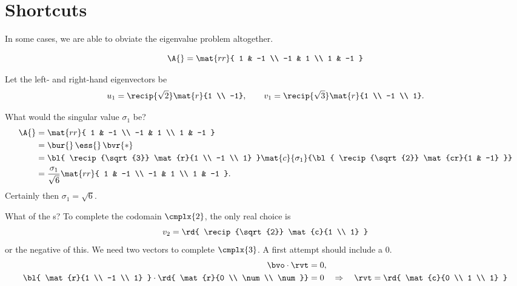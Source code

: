 \section{Shortcuts}
In some cases, we are able to obviate the eigenvalue problem altogether.

\begin{equation}
  \A{} = \mat{rr}{
   1 & -1 \\
  -1 &  1 \\
   1 & -1 }
\end{equation}

Let the left- and right-hand eigenvectors be
\begin{equation}
  u_{1} = \recip{\sqrt{2}} \mat{r}{1 \\ -1}, \qquad
  v_{1} = \recip{\sqrt{3}} \mat{r}{1 \\ -1 \\ 1}.
\end{equation}

What would the singular value $\sigma_{1}$ be?
%
\begin{equation}
  \begin{split}
  \A{} 
  &= \mat{rr}{
   1 & -1 \\
  -1 &  1 \\
   1 & -1 } \\
%
  &=
  \bur{}\, \ess{}\, \bvr{*} \\
%
  &=
  {\bl{ \recip{\sqrt{3}} \mat{r}{1 \\ -1 \\ 1} }} 
  \mat{c}{ \sigma_{1} }
  {\bl{ \recip{\sqrt{2}} \mat{cr}{1 & -1} }} \\
%
  &=
  \frac{\sigma_{1}} {\sqrt{6}}
  \mat{rr}{
   1 & -1 \\
  -1 &  1 \\
   1 & -1 }.
%
  \end{split}
\end{equation}
%
Certainly then $\sigma_{1} = \sqrt{6}$.
  
What of the \ns s? To complete the codomain $\cmplx{2}$, the only real choice is
\begin{equation}
  v_{2} = {\rd{ \recip{\sqrt{2}} \mat{c}{1 \\ 1} }}
\end{equation}
or the negative of this. We need two vectors to complete $\cmplx{3}$. A first attempt should include a 0.
\begin{equation}
  \begin{split}
    \bvo \cdot \rvt &= 0 , \\
%
   {\bl{ \mat{r}{1 \\ -1 \\ 1} }} \cdot
   {\rd{ \mat{r}{0 \\ \num \\ \num}}} &= 0 
%
   \quad \Rightarrow\quad  \rvt =
   {\rd{ \mat{c}{0 \\ 1 \\ 1} }}
%
  \end{split}
\end{equation}



\endinput
